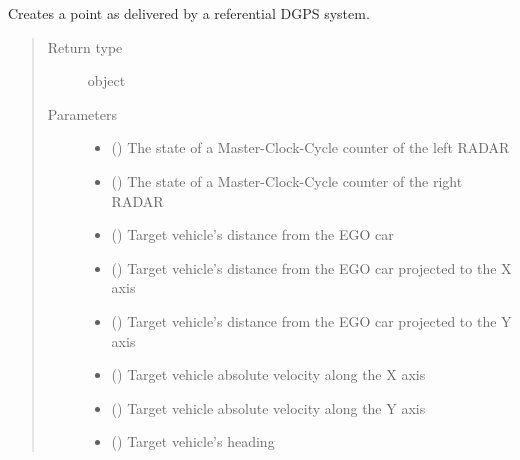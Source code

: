 \documentclass[letterpaper,10pt,english]{sphinxmanual}
\begin{document}
\begin{fulllineitems}
\label{\detokenize{datacontainers:data_containers.ReferencePoint}}
Creates a point as delivered by a referential DGPS system.
\begin{quote}\begin{description}
\item[{Return type}] \leavevmode
object

\item[{Parameters}] \leavevmode\begin{itemize}
\item {} 
 () \textendash{} The state of a Master-Clock-Cycle counter of the left RADAR

\item {} 
 () \textendash{} The state of a Master-Clock-Cycle counter of the right RADAR

\item {} 
 () \textendash{} Target vehicle’s distance from the EGO car

\item {} 
 () \textendash{} Target vehicle’s distance from the EGO car projected to the X axis

\item {} 
 () \textendash{} Target vehicle’s distance from the EGO car projected to the Y axis

\item {} 
 () \textendash{} Target vehicle absolute velocity along the X axis

\item {} 
 () \textendash{} Target vehicle absolute velocity along the Y axis

\item {} 
 () \textendash{} Target vehicle’s heading


\end{itemize}
\end{description}
\end{quote}
\end{fulllineitems}
\end{document}
